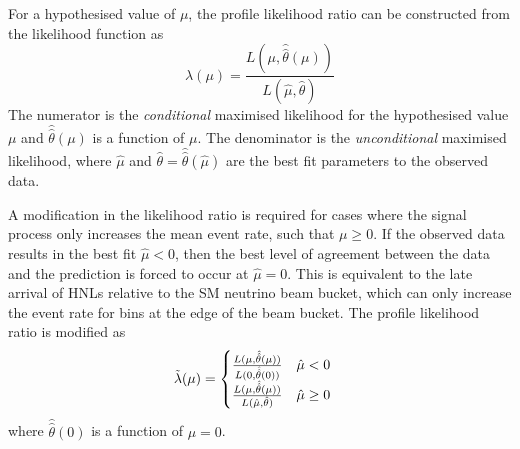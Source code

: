 For a hypothesised value of $\mu$, the profile likelihood ratio can be constructed from the likelihood function as \cite{asymptotic_test}
\begin{equation}
\label{eq:likelihood_ratio}
    \lambda(\mu) = \frac{L(\mu, \hat{\hat{\theta}}(\mu))}{L(\hat{\mu},\hat{\theta})}
\end{equation}
The numerator is the \textit{conditional} maximised likelihood for the hypothesised value $\mu$ and $\hat{\hat{\theta}}(\mu)$ is a function of $\mu$.
The denominator is the \textit{unconditional} maximised likelihood, where $\hat{\mu}$ and $\hat{\theta} = \hat{\hat{\theta}}(\hat{\mu})$ are the best fit parameters to the observed data.

A modification in the likelihood ratio is required for cases where the signal process only increases the mean event rate, such that $\mu \geq 0$.
If the observed data results in the best fit $\hat{\mu} < 0$, then the best level of agreement between the data and the prediction is forced to occur at $\hat{\mu} = 0$.
This is equivalent to the late arrival of HNLs relative to the SM neutrino beam bucket, which can only increase the event rate for bins at the edge of the beam bucket.
The profile likelihood ratio is modified as \cite{asymptotic_test}
\begin{equation}
    \Tilde{\lambda}(\mu) =
    \begin{cases}
        \frac{L(\mu, \hat{\hat{\theta}}(\mu) )}{L(0, \hat{\hat{\theta}} (0))}\ \ \ \hat{\mu} < 0 \\
        \frac{L(\mu, \hat{\hat{\theta}}(\mu) )}{L(\hat{\mu}, \hat{\theta})}\ \ \ \hat{\mu} \geq 0 \\
    \end{cases}
\end{equation}
where $\hat{\hat{\theta}} (0)$ is a function of $\mu = 0$. 

